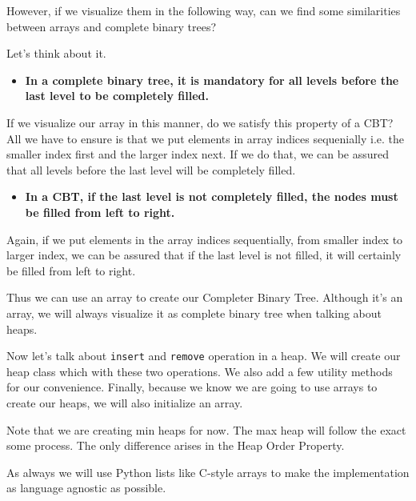 \documentclass[11pt]{article}
\providecommand{\tightlist}{%
      \setlength{\itemsep}{0pt}\setlength{\parskip}{0pt}}
\begin{document}
However, if we visualize them in the following way, can we find some
similarities between arrays and complete binary trees?

    Let's think about it.

\begin{itemize}
\tightlist
\item
  \textbf{In a complete binary tree, it is mandatory for all levels
  before the last level to be completely filled.}
\end{itemize}

If we visualize our array in this manner, do we satisfy this property of
a CBT? All we have to ensure is that we put elements in array indices
sequenially i.e. the smaller index first and the larger index next. If
we do that, we can be assured that all levels before the last level will
be completely filled.

\begin{itemize}
\tightlist
\item
  \textbf{In a CBT, if the last level is not completely filled, the
  nodes must be filled from left to right.}
\end{itemize}

Again, if we put elements in the array indices sequentially, from
smaller index to larger index, we can be assured that if the last level
is not filled, it will certainly be filled from left to right.

Thus we can use an array to create our Completer Binary Tree. Although
it's an array, we will always visualize it as complete binary tree when
talking about heaps.

    Now let's talk about \texttt{insert} and \texttt{remove} operation in a
heap. We will create our heap class which with these two operations. We
also add a few utility methods for our convenience. Finally, because we
know we are going to use arrays to create our heaps, we will also
initialize an array.

Note that we are creating min heaps for now. The max heap will follow
the exact some process. The only difference arises in the Heap Order
Property.

As always we will use Python lists like C-style arrays to make the
implementation as language agnostic as possible.
\end{document}
